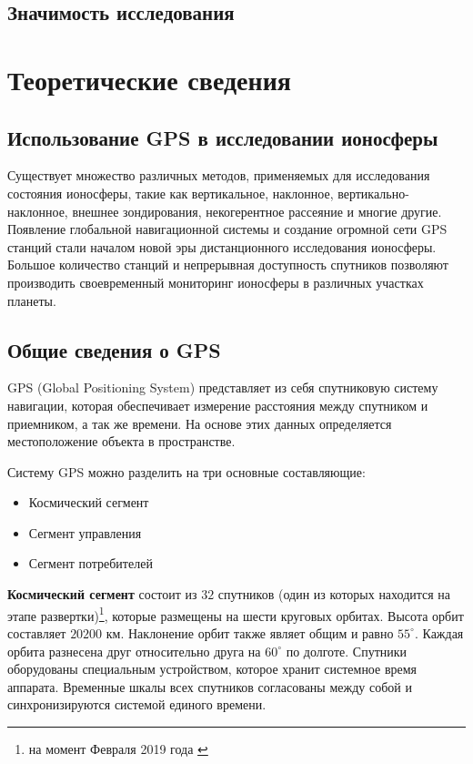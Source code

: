 \documentclass[14pt]{article}
\begin{document}
\subsection*{Значимость исследования}


\newpage
\section{Теоретические сведения}
\subsection{Использование GPS в исследовании ионосферы}
Существует множество различных методов, применяемых для исследования состояния ионосферы, такие как вертикальное, наклонное, вертикально-наклонное, внешнее зондирования, некогерентное рассеяние и многие другие. Появление глобальной навигационной системы и создание огромной сети GPS станций стали началом новой эры дистанционного исследования ионосферы. Большое количество станций и непрерывная доступность спутников позволяют производить своевременный мониторинг ионосферы в различных участках планеты. 

\subsection{Общие сведения о GPS}
GPS (Global Positioning System) представляет из себя спутниковую систему навигации, которая обеспечивает измерение расстояния между спутником и приемником, а так же времени. На основе этих данных определяется местоположение объекта в пространстве.

Систему GPS можно разделить на три основные составляющие:
\begin{itemize}
\item Космический сегмент
\item Сегмент управления
\item Сегмент потребителей
\end{itemize}

\textbf{Космический сегмент} состоит из $32$ спутников (один из которых находится на этапе развертки)\footnote{на момент Февраля 2019 года \cite{gpsgov}}, которые размещены на шести круговых орбитах. Высота орбит составляет $20200$ км. Наклонение орбит также являет общим и равно $55^{\circ}$. Каждая орбита разнесена друг относительно друга на $60^{\circ}$ по долготе. Спутники оборудованы специальным устройством, которое хранит системное время аппарата. Временные шкалы всех спутников согласованы между собой и синхронизируются системой единого времени.
\end{document}
